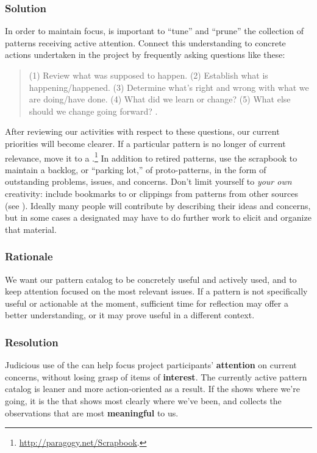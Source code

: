 \subsubsection*{Solution} In order to maintain focus, is important to ``tune'' and ``prune'' the collection of patterns receiving active attention.  Connect this understanding to concrete actions undertaken in the project by frequently asking questions like these:
\begin{quote}
(1) Review what was supposed to happen.
(2) Establish what is happening/happened.
(3) Determine what’s right and wrong with what we are doing/have done.
(4) What did we learn or change? 
(5) What else should we change going forward?  \cite[Chapter 28]{peeragogy-handbook}.
\end{quote}
%
After reviewing our activities with respect to these questions, our
current priorities will become clearer.  If a particular pattern is no
longer of current relevance, move it to a
.\footnote{\url{http://paragogy.net/Scrapbook}.}  
%
In addition to retired patterns, use the scrapbook to maintain a
backlog, or ``parking lot,'' of proto-patterns, in the form of
outstanding problems, issues, and concerns.  Don't limit yourself to
\emph{your own} creativity: include bookmarks to or clippings from
patterns from other sources (see ).  Ideally many people will contribute by describing their ideas and concerns, but in some cases a designated  may have to do further work to elicit and organize that material.

\subsubsection*{Rationale} 
We want our pattern catalog to be concretely useful and actively used,
and to keep attention focused on the most relevant issues.
If a pattern is not specifically useful or actionable at the
moment, sufficient time for reflection may offer a better
understanding, or it may prove useful in a different context.

\subsubsection*{Resolution} 
Judicious use of the  can help focus project participants' \textbf{attention} on current concerns, without losing grasp of items of \textbf{interest}.  The currently active pattern catalog is leaner and more action-oriented as a result. If the  shows where we're going, it is the  that shows most clearly where we've been, and collects the observations that are most \textbf{meaningful} to us.


